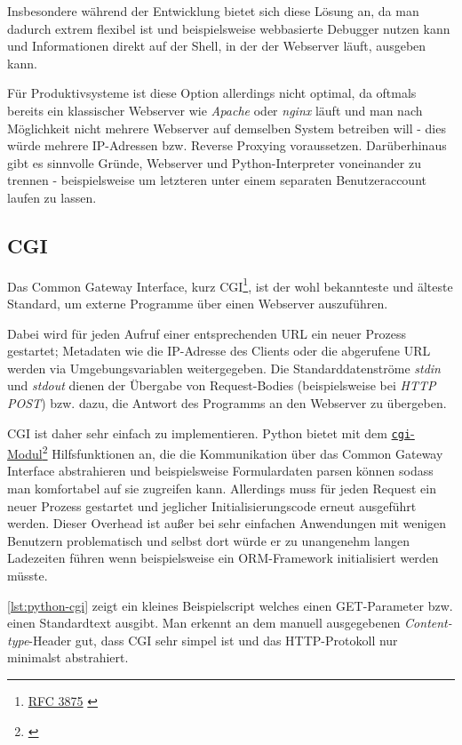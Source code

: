 Insbesondere während der Entwicklung bietet sich diese Lösung an, da man dadurch extrem flexibel
ist und beispielsweise webbasierte Debugger nutzen kann und Informationen direkt auf der Shell, in
der der Webserver läuft, ausgeben kann.

Für Produktivsysteme ist diese Option allerdings nicht optimal, da oftmals bereits ein klassischer
Webserver wie \emph{Apache} oder \emph{nginx} läuft und man nach Möglichkeit nicht mehrere Webserver
auf demselben System betreiben will - dies würde mehrere IP-Adressen bzw. Reverse Proxying
voraussetzen. Darüberhinaus gibt es sinnvolle Gründe, Webserver und Python-Interpreter voneinander
zu trennen - beispielsweise um letzteren unter einem separaten Benutzeraccount laufen zu lassen.

\subsection{CGI}

Das Common Gateway Interface, kurz CGI\footnote{\href{http://www.ietf.org/rfc/rfc3875}{RFC 3875}
\citep{rfc3875}},
ist der wohl bekannteste und älteste Standard, um externe Programme über einen Webserver
auszuführen.

Dabei wird für jeden Aufruf einer entsprechenden URL ein neuer Prozess gestartet; Metadaten wie die
IP-Adresse des Clients oder die abgerufene URL werden via Umgebungsvariablen weitergegeben. Die
Standarddatenströme \emph{stdin} und \emph{stdout} dienen der Übergabe von Request-Bodies
(beispielsweise bei \emph{HTTP POST}) bzw. dazu, die Antwort des Programms an den Webserver
zu übergeben.

CGI ist daher sehr einfach zu implementieren. Python bietet mit dem
\href{http://docs.python.org/library/cgi.html}{\lstinline{cgi}-Modul}\footnote{\citep{pycgi}}
Hilfsfunktionen an, die die
Kommunikation über das Common Gateway Interface abstrahieren und beispielsweise Formulardaten
parsen können sodass man komfortabel auf sie zugreifen kann. Allerdings muss für jeden Request ein
neuer Prozess gestartet und jeglicher Initialisierungscode erneut ausgeführt werden. Dieser Overhead
ist außer bei sehr einfachen Anwendungen mit wenigen Benutzern problematisch und selbst dort würde
er zu unangenehm langen Ladezeiten führen wenn beispielsweise ein ORM-Framework initialisiert werden
müsste.

\autoref{lst:python-cgi} zeigt ein kleines Beispielscript welches einen GET-Parameter bzw. einen
Standardtext ausgibt. Man erkennt an dem manuell ausgegebenen \emph{Content-type}-Header gut, dass
CGI sehr simpel ist und das HTTP-Protokoll nur minimalst abstrahiert.

